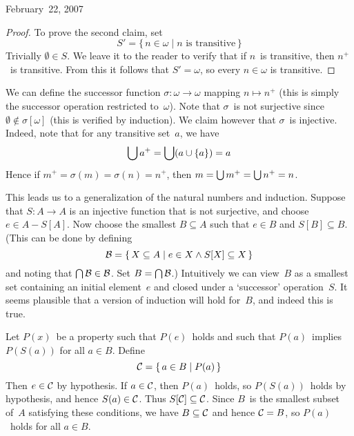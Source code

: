 \begin{lecture}{February~22, 2007}
\begin{proof}
To prove the second claim, set
\[S'=\{\,n\in\omega\mid n\text{ is transitive}\,\}\]
Trivially \(\emptyset\in S\). We leave it to the reader to verify that if \(n\)~is transitive, then \(n^+\)~is transitive. From this it follows that \(S'=\omega\), so every \(n\in\omega\) is transitive.
\end{proof}

We can define the successor function \(\sigma:\omega\to\omega\) mapping \(n\mapsto n^+\) (this is simply the successor operation restricted to~\(\omega\)). Note that \(\sigma\)~is not surjective since \(\emptyset\not\in\sigma[\omega]\) (this is verified by induction). We claim however that \(\sigma\)~is injective. Indeed, note that for any transitive set~\(a\), we have
\[\bigcup a^+=\bigcup(a\cup\{a\})=a\]
Hence if \(m^+=\sigma(m)=\sigma(n)=n^+\), then \(m=\bigcup m^+=\bigcup n^+=n\).

This leads us to a generalization of the natural numbers and induction. Suppose that \(S:A\to A\) is an injective function that is not surjective, and choose \(e\in A-S[A]\). Now choose the smallest \(B\subseteq A\) such that \(e\in B\) and \(S[B]\subseteq B\). (This can be done by defining
\[\mathcal{B}=\{\,X\subseteq A\mid e\in X\land S[X]\subseteq X\,\}\]
and noting that \(\bigcap\mathcal{B}\in\mathcal{B}\). Set \(B=\bigcap\mathcal{B}\).) Intuitively we can view~\(B\) as a smallest set containing an initial element~\(e\) and closed under a `successor' operation~\(S\). It seems plausible that a version of induction will hold for~\(B\), and indeed this is true.

Let \(P(x)\)~be a property such that \(P(e)\)~holds and such that \(P(a)\)~implies~\(P(S(a))\) for all \(a\in B\). Define
\[\mathcal{C}=\{\,a\in B\mid P(a)\,\}\]
Then \(e\in\mathcal{C}\) by hypothesis. If \(a\in\mathcal{C}\), then \(P(a)\)~holds, so \(P(S(a))\)~holds by hypothesis, and hence \(S(a)\in\mathcal{C}\). Thus \(S[\mathcal{C}]\subseteq\mathcal{C}\). Since \(B\)~is the smallest subset of~\(A\) satisfying these conditions, we have \(B\subseteq\mathcal{C}\) and hence \(\mathcal{C}=B\), so \(P(a)\)~holds for all \(a\in B\).


\end{lecture}

